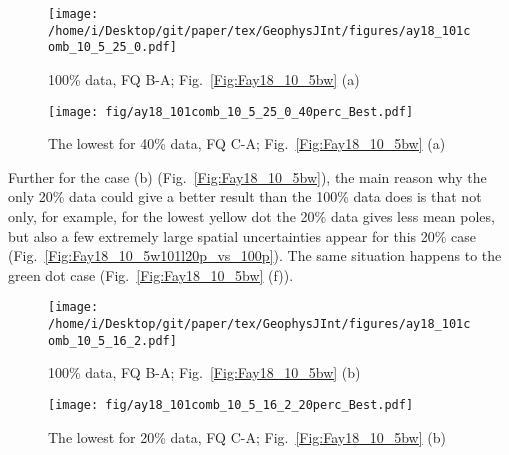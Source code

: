 \begin{figure*}[tbp]
  \captionsetup[subfigure]{labelformat=empty,aboveskip=-6pt,belowskip=-6pt}
  \centering
  \begin{subfigure}[htbp]{.49\textwidth}
    \captionsetup{skip=0pt}  %
    \centering
    \texttt{[image: /home/i/Desktop/git/paper/tex/GeophysJInt/figures/ay18\_101comb\_10\_5\_25\_0.pdf]}
	\caption{100\% data, FQ B-A; Fig.~\ref{Fig:Fay18_10_5bw}
	(a)}\label{Fig:Fay18_10_5b101}
  \end{subfigure}
  \begin{subfigure}[htbp]{.49\textwidth}
    \captionsetup{skip=0pt}
    \centering
    \texttt{[image: fig/ay18\_101comb\_10\_5\_25\_0\_40perc\_Best.pdf]}
    \caption{The lowest for 40\% data, FQ C-A;
	Fig.~\ref{Fig:Fay18_10_5bw} (a)}\label{Fig:Fay18_10_5b101l40p}
  \end{subfigure}
  \caption[Less data, better similarity?]{Comparing the 100\% North American
  120 Ma paleomagnetic data derived result with the best of the only
  40\% data (giving even better similarity) derived results (the lowest yellow
  dot in Fig.~\ref{Fig:Fay18_10_5bw} (a)).}\label{Fig:Fay18_10_5b101l40p_vs_100p}
\end{figure*}

Further for the case (b) (Fig.~\ref{Fig:Fay18_10_5bw}), the main reason why the
only 20\% data could give a better result than the 100\% data does is that not
only, for example, for the lowest yellow dot the 20\% data gives less mean
poles, but also a few extremely large spatial uncertainties appear for this
20\% case (Fig.~\ref{Fig:Fay18_10_5w101l20p_vs_100p}). The same situation
happens to the green dot case (Fig.~\ref{Fig:Fay18_10_5bw} (f)).

\begin{figure*}[tbp]
  \captionsetup[subfigure]{labelformat=empty,aboveskip=-6pt,belowskip=-6pt}
  \centering
  \begin{subfigure}[htbp]{.49\textwidth}
    \captionsetup{skip=0pt}
    \centering
    \texttt{[image: /home/i/Desktop/git/paper/tex/GeophysJInt/figures/ay18\_101comb\_10\_5\_16\_2.pdf]}
	\caption{100\% data, FQ B-A; Fig.~\ref{Fig:Fay18_10_5bw}
	(b)}\label{Fig:Fay18_10_5w101}
  \end{subfigure}
  \begin{subfigure}[htbp]{.49\textwidth}
    \captionsetup{skip=0pt}
    \centering
    \texttt{[image: fig/ay18\_101comb\_10\_5\_16\_2\_20perc\_Best.pdf]}  %
    \caption{The lowest for 20\% data, FQ C-A;
	Fig.~\ref{Fig:Fay18_10_5bw} (b)}\label{Fig:Fay18_10_5w101l20p}
  \end{subfigure}
  \caption[Less data, better similarity?]{Comparing the 100\% North American
  120 Ma paleomagnetic data derived result with the best of the only
  20\% data (giving even better similarity) derived results (the yellow dot in
  Fig.~\ref{Fig:Fay18_10_5bw} (b)).}\label{Fig:Fay18_10_5w101l20p_vs_100p}
\end{figure*}

